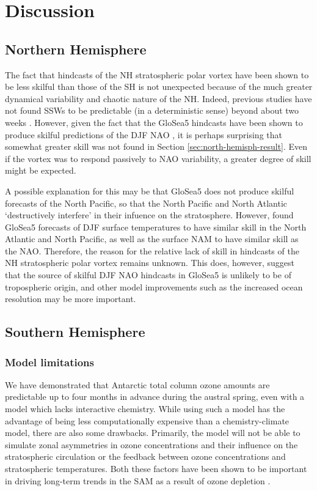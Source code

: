 \section{Discussion}
\label{sec:seas-discussion}
\subsection{Northern Hemisphere}

The fact that hindcasts of the NH stratospheric polar vortex have been shown to
be less skilful than those of the SH is not unexpected because of the much
greater dynamical variability and chaotic nature of the NH. Indeed, previous
studies have not found SSWs to be predictable (in a deterministic sense) beyond
about two weeks \citep{Marshall2010,Taguchi2014}. However, given the fact that
the GloSea5 hindcasts have been shown to produce skilful predictions of the DJF
NAO \citep{Scaife2013}, it is perhaps surprising that somewhat greater skill was
not found in Section \ref{sec:north-hemisph-result}. Even if the vortex was to
respond passively to NAO variability, a greater degree of skill might be
expected.

A possible explanation for this may be that GloSea5 does not produce skilful
forecasts of the North Pacific, so that the North Pacific and North Atlantic
`destructively interfere' in their infuence on the stratosphere. However,
\citet{MacLachlan2014} found GloSea5 forecasts of DJF surface temperatures to
have similar skill in the North Atlantic and North Pacific, as well as the
surface NAM to have similar skill as the NAO. Therefore, the reason for the
relative lack of skill in hindcasts of the NH stratospheric polar vortex remains
unknown. This does, however, suggest that the source of skilful DJF NAO
hindcasts in GloSea5 is unlikely to be of tropospheric origin, and other model
improvements such as the increased ocean resolution may be more important.


\subsection{Southern Hemisphere}
\subsubsection{Model limitations}

We have demonstrated that Antarctic total column ozone amounts are predictable
up to four months in advance during the austral spring, even with a model which
lacks interactive chemistry. While using such a model has the advantage of being
less computationally expensive than a chemistry-climate model, there are also
some drawbacks. Primarily, the model will not be able to simulate zonal
asymmetries in ozone concentrations and their influence on the stratospheric
circulation or the feedback between ozone concentrations and stratospheric
temperatures. Both these factors have been shown to be important in driving
long-term trends in the SAM as a result of ozone depletion \citep{Thompson2002a,
  Crook2008, Waugh2009}.

